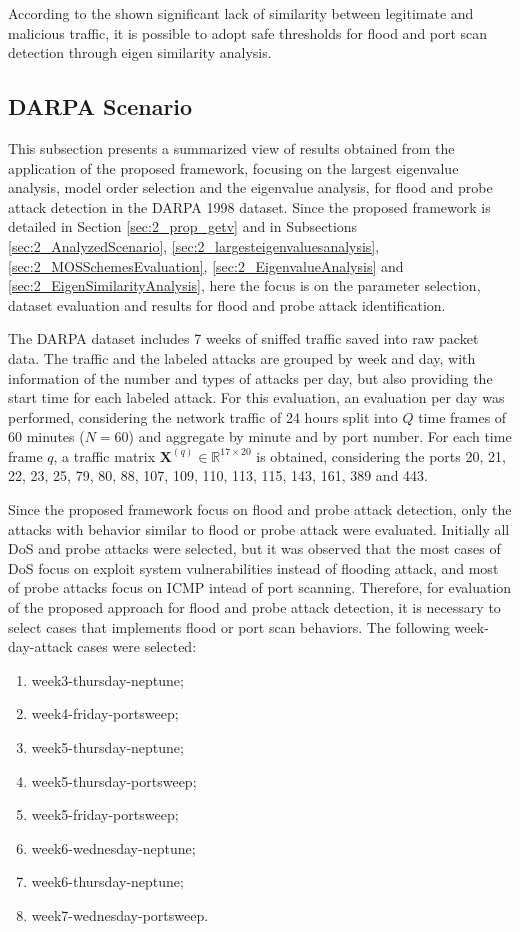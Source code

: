 According to the shown significant lack of similarity between legitimate and malicious traffic, it is possible to adopt safe thresholds for flood and port scan detection through eigen similarity analysis.

\subsection{DARPA Scenario}
\label{sec:2_DarpaEvaluation}

This subsection presents a summarized view of results obtained from the application of the proposed framework, focusing on the largest eigenvalue analysis, model order selection and the eigenvalue analysis, for flood and probe attack detection in the DARPA 1998 dataset. Since the proposed framework is detailed in Section \ref{sec:2_prop_getv} and in Subsections \ref{sec:2_AnalyzedScenario}, \ref{sec:2_largesteigenvaluesanalysis}, \ref{sec:2_MOSSchemesEvaluation}, \ref{sec:2_EigenvalueAnalysis} and \ref{sec:2_EigenSimilarityAnalysis}, here the focus is on the parameter selection, dataset evaluation and results for flood and probe attack identification.

The DARPA dataset includes 7 weeks of sniffed traffic saved into raw packet data. The traffic and the labeled attacks are grouped by week and day, with information of the number and types of attacks per day, but also providing the start time for each labeled attack. For this evaluation, an evaluation per day was performed, considering the network traffic of 24 hours split into $Q$ time frames of 60 minutes ($N = 60$) and aggregate by minute and by port number. For each time frame $q$, a traffic matrix $\boldsymbol{X}^{(q)} \in \mathbb{R}^{17 \times 20}$ is obtained, considering the ports 20, 21, 22, 23, 25, 79, 80, 88, 107, 109, 110, 113, 115, 143, 161, 389 and 443.

Since the proposed framework focus on flood and probe attack detection, only the attacks with behavior similar to flood or probe attack were evaluated. Initially all DoS and probe attacks were selected, but it was observed that the most cases of DoS focus on exploit system vulnerabilities instead of flooding attack, and most of probe attacks focus on ICMP intead of port scanning. Therefore, for evaluation of the proposed approach for flood and probe attack detection, it is necessary to select cases that implements flood or port scan behaviors. The following week-day-attack cases  were selected: 

\begin{enumerate}
	\item week3-thursday-neptune;
	\item week4-friday-portsweep;
	\item week5-thursday-neptune;
	\item week5-thursday-portsweep;
	\item week5-friday-portsweep;
	\item week6-wednesday-neptune;
	\item week6-thursday-neptune;
	\item week7-wednesday-portsweep.
\end{enumerate}

